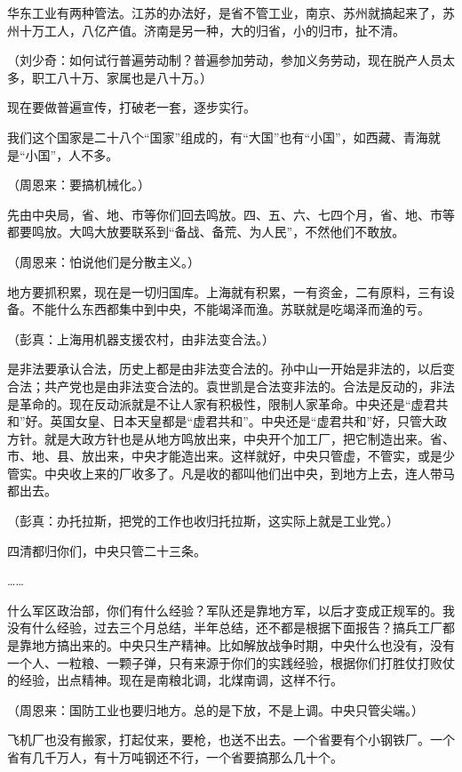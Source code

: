 华东工业有两种管法。江苏的办法好，是省不管工业，南京、苏州就搞起来了，苏州十万工人，八亿产值。济南是另一种，大的归省，小的归市，扯不清。

（刘少奇：如何试行普遍劳动制？普遍参加劳动，参加义务劳动，现在脱产人员太多，职工八十万、家属也是八十万。）

现在要做普遍宣传，打破老一套，逐步实行。

我们这个国家是二十八个“国家”组成的，有“大国”也有“小国”，如西藏、青海就是“小国”，人不多。

（周恩来：要搞机械化。）

先由中央局，省、地、市等你们回去鸣放。四、五、六、七四个月，省、地、市等都要鸣放。大鸣大放要联系到“备战、备荒、为人民”，不然他们不敢放。

（周恩来：怕说他们是分散主义。）

地方要抓积累，现在是一切归国库。上海就有积累，一有资金，二有原料，三有设备。不能什么东西都集中到中央，不能竭泽而渔。苏联就是吃竭泽而渔的亏。

（彭真：上海用机器支援农村，由非法变合法。）

是非法要承认合法，历史上都是由非法变合法的。孙中山一开始是非法的，以后变合法；共产党也是由非法变合法的。袁世凯是合法变非法的。合法是反动的，非法是革命的。现在反动派就是不让人家有积极性，限制人家革命。中央还是“虚君共和”好。英国女皇、日本天皇都是“虚君共和”。中央还是“虚君共和”好，只管大政方针。就是大政方针也是从地方鸣放出来，中央开个加工厂，把它制造出来。省、市、地、县、放出来，中央才能造出来。这样就好，中央只管虚，不管实，或是少管实。中央收上来的厂收多了。凡是收的都叫他们出中央，到地方上去，连人带马都出去。

（彭真：办托拉斯，把党的工作也收归托拉斯，这实际上就是工业党。）

四清都归你们，中央只管二十三条。

……

什么军区政治部，你们有什么经验？军队还是靠地方军，以后才变成正规军的。我没有什么经验，过去三个月总结，半年总结，还不都是根据下面报告？搞兵工厂都是靠地方搞出来的。中央只生产精神。比如解放战争时期，中央什么也没有，没有一个人、一粒粮、一颗子弹，只有来源于你们的实践经验，根据你们打胜仗打败仗的经验，出点精神。现在是南粮北调，北煤南调，这样不行。

（周恩来：国防工业也要归地方。总的是下放，不是上调。中央只管尖端。）

飞机厂也没有搬家，打起仗来，要枪，也送不出去。一个省要有个小钢铁厂。一个省有几千万人，有十万吨钢还不行，一个省要搞那么几十个。

